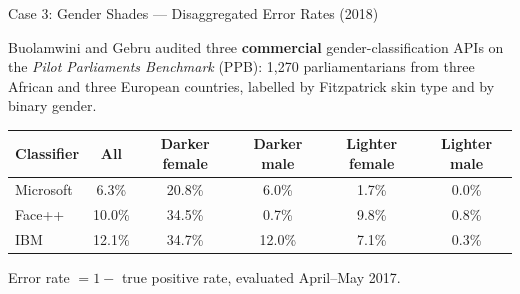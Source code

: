 
\begin{frame}{Case 3: Gender Shades --- Disaggregated Error Rates (2018)}

    Buolamwini and Gebru audited three \textbf{commercial} gender-classification APIs on the
    \emph{Pilot Parliaments Benchmark} (PPB): 1{,}270 parliamentarians from three African and three
    European countries, labelled by Fitzpatrick skin type and by binary gender.

    \vspace{0.18em}
    \centering
    \scriptsize
    \begin{tabular}{lccccc}
        \toprule
        \textbf{Classifier} & \textbf{All} & \textbf{Darker female} & \textbf{Darker male}
        & \textbf{Lighter female} & \textbf{Lighter male} \\
        \midrule
        Microsoft & 6.3\%  & 20.8\% & 6.0\%  & 1.7\% & 0.0\% \\
        Face++    & 10.0\% & 34.5\% & 0.7\%  & 9.8\% & 0.8\% \\
        IBM       & 12.1\% & 34.7\% & 12.0\% & 7.1\% & 0.3\% \\
        \bottomrule
    \end{tabular}

    \vspace{0.12em}
    {\scriptsize Error rate $=1-$ true positive rate, evaluated April--May 2017.}


\end{frame}
